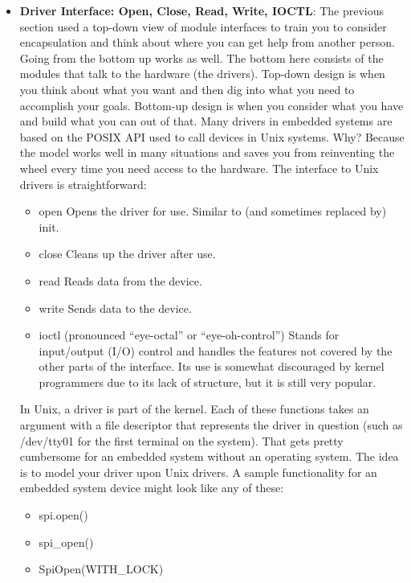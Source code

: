 \documentclass{report}
\begin{document}
\begin{itemize}
        \item \textbf{Driver Interface: Open, Close, Read, Write, IOCTL}: The previous section used a top-down view of module interfaces to train you to consider encapsulation and think about where you can get help from another person. Going from the bottom up works as well. The bottom here consists of the modules that talk to the hardware (the drivers).
            \bigbreak \noindent 
            Top-down design is when you think about what you want and then dig into what you need to accomplish your goals. Bottom-up design is when you consider what you have and build what you can out of that.
            \bigbreak \noindent 
            Many drivers in embedded systems are based on the POSIX API used to call devices in Unix systems. Why? Because the model works well in many situations and saves you from reinventing the wheel every time you need access to the hardware.
            \bigbreak \noindent 
            The interface to Unix drivers is straightforward:
            \begin{itemize}
                \item open Opens the driver for use. Similar to (and sometimes replaced by) init.
                \item close Cleans up the driver after use.
                \item read Reads data from the device.
                \item write Sends data to the device.
                \item ioctl (pronounced “eye-octal” or “eye-oh-control”) Stands for input/output (I/O) control and handles the features not covered by the other parts of the interface. Its use is somewhat discouraged by kernel programmers due to its lack of structure, but it is still very popular.
            \end{itemize}
            In Unix, a driver is part of the kernel. Each of these functions takes an argument with a file descriptor that represents the driver in question (such as /dev/tty01 for the first terminal on the system). That gets pretty cumbersome for an embedded system without an operating system. The idea is to model your driver upon Unix drivers. A sample functionality for an embedded system device might look like any of these:
            \begin{itemize}
                \item spi.open()
                \item spi\_open()
                \item SpiOpen(WITH\_LOCK)

\end{itemize}
\end{itemize}
\end{document}
